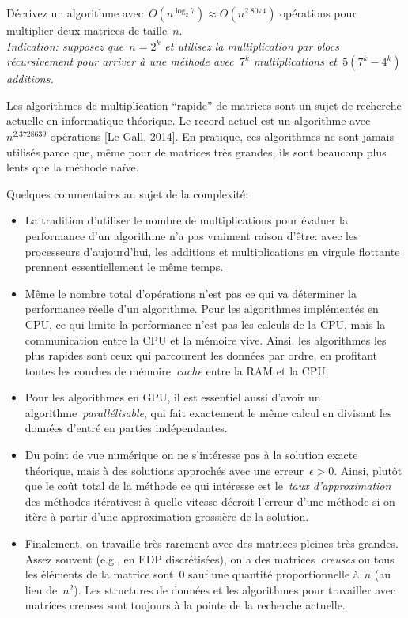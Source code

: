 \begin{exercice}
	Décrivez un algorithme avec~$O(n^{\log_2 7})\approx O(n^{2.8074})$ opérations
	pour multiplier deux matrices de taille~$n$.\\
	\emph{Indication: supposez que~$n=2^k$ et utilisez la
		multiplication par blocs récursivement pour arriver à une méthode
		avec~$7^k$ multiplications et~$5(7^k-4^k)$ additions.
	}
\end{exercice}

Les algorithmes de multiplication ``rapide'' de matrices sont un sujet de
recherche actuelle en informatique théorique.  Le record actuel est un
algorithme avec $n^{2.3728639}$ opérations [Le Gall, 2014].  En pratique, ces
algorithmes ne sont jamais utilisés parce que, même pour de matrices très
grandes, ils sont beaucoup plus lents que la méthode naïve.

Quelques commentaires au sujet de la complexité:

\begin{itemize}
	\item La tradition d'utiliser le nombre de multiplications pour évaluer la
		performance d'un algorithme n'a pas vraiment raison d'être: avec les
		processeurs d'aujourd'hui, les additions et multiplications en virgule
		flottante prennent essentiellement le même temps.
	\item Même le nombre total d'opérations n'est pas ce qui va déterminer la
		performance réelle d'un algorithme.  Pour les algorithmes implémentés en
		CPU, ce qui limite la performance n'est pas les calculs de la CPU, mais
		la communication entre la CPU et la mémoire vive.  Ainsi, les algorithmes
		les plus rapides sont ceux qui parcourent les données par ordre, en
		profitant toutes les couches de mémoire~\emph{cache} entre la RAM et la
		CPU.
	\item Pour les algorithmes en GPU, il est essentiel aussi d'avoir un
		algorithme~\emph{parallélisable}, qui fait exactement le même calcul en
		divisant les données d'entré en parties indépendantes.
	\item Du point de vue numérique on ne s'intéresse pas à la solution exacte
		théorique, mais à des solutions approchés avec une erreur~$\epsilon>0$.
		Ainsi, plutôt que le coût total de la méthode ce qui intéresse est
		le~\emph{taux d'approximation} des méthodes itératives: à quelle vitesse
		décroit l'erreur d'une méthode si on itère à partir d'une approximation
		grossière de la solution.
	\item Finalement, on travaille très rarement avec des matrices pleines très
		grandes.  Assez souvent (e.g., en EDP discrétisées), on a des
		matrices~\emph{creuses} ou tous les éléments de la matrice
		sont~$0$ sauf une quantité proportionnelle à~$n$ (au lieu de~$n^2$).
		Les structures de données et les algorithmes pour travailler avec
		matrices creuses sont toujours à la pointe de la recherche actuelle.
\end{itemize}

